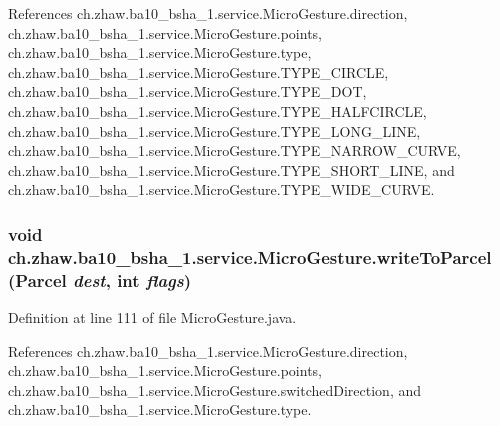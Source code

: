 References ch.zhaw.ba10\_\-bsha\_\-1.service.MicroGesture.direction, ch.zhaw.ba10\_\-bsha\_\-1.service.MicroGesture.points, ch.zhaw.ba10\_\-bsha\_\-1.service.MicroGesture.type, ch.zhaw.ba10\_\-bsha\_\-1.service.MicroGesture.TYPE\_\-CIRCLE, ch.zhaw.ba10\_\-bsha\_\-1.service.MicroGesture.TYPE\_\-DOT, ch.zhaw.ba10\_\-bsha\_\-1.service.MicroGesture.TYPE\_\-HALFCIRCLE, ch.zhaw.ba10\_\-bsha\_\-1.service.MicroGesture.TYPE\_\-LONG\_\-LINE, ch.zhaw.ba10\_\-bsha\_\-1.service.MicroGesture.TYPE\_\-NARROW\_\-CURVE, ch.zhaw.ba10\_\-bsha\_\-1.service.MicroGesture.TYPE\_\-SHORT\_\-LINE, and ch.zhaw.ba10\_\-bsha\_\-1.service.MicroGesture.TYPE\_\-WIDE\_\-CURVE.\hypertarget{classch_1_1zhaw_1_1ba10__bsha__1_1_1service_1_1MicroGesture_ad934b5c1c2c627ea41d1a4d81d30e448}{
\subsubsection[{writeToParcel}]{\setlength{\rightskip}{0pt plus 5cm}void ch.zhaw.ba10\_\-bsha\_\-1.service.MicroGesture.writeToParcel (Parcel {\em dest}, \/  int {\em flags})}}
\label{classch_1_1zhaw_1_1ba10__bsha__1_1_1service_1_1MicroGesture_ad934b5c1c2c627ea41d1a4d81d30e448}


Definition at line 111 of file MicroGesture.java.

References ch.zhaw.ba10\_\-bsha\_\-1.service.MicroGesture.direction, ch.zhaw.ba10\_\-bsha\_\-1.service.MicroGesture.points, ch.zhaw.ba10\_\-bsha\_\-1.service.MicroGesture.switchedDirection, and ch.zhaw.ba10\_\-bsha\_\-1.service.MicroGesture.type.

